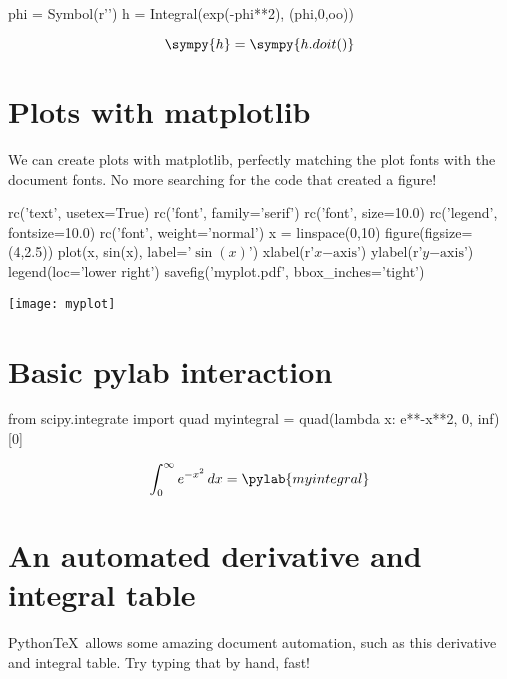 \documentclass[11pt]{article}
\newcommand{\pytex}{Python\TeX}
\begin{document}
\begin{sympyblock}
phi = Symbol(r'\phi')
h = Integral(exp(-phi**2), (phi,0,oo))
\end{sympyblock}

\[\sympy{h}=\sympy{h.doit()}\]



\section{Plots with matplotlib}

We can create plots with matplotlib, perfectly matching the plot fonts with the document fonts.  No more searching for the code that created a figure!

\begin{pylabblock}
rc('text', usetex=True)
rc('font', family='serif')
rc('font', size=10.0)
rc('legend', fontsize=10.0)
rc('font', weight='normal')
x = linspace(0,10)
figure(figsize=(4,2.5))
plot(x, sin(x), label='$\sin(x)$')
xlabel(r'$x\mathrm{-axis}$')
ylabel(r'$y\mathrm{-axis}$')
legend(loc='lower right')
savefig('myplot.pdf', bbox_inches='tight')
\end{pylabblock}

\begin{center}
\texttt{[image: myplot]}
\end{center}


\section{Basic pylab interaction}

\begin{pylabblock}
from scipy.integrate import quad
myintegral = quad(lambda x: e**-x**2, 0, inf)[0]
\end{pylabblock}

\[ \int_0^\infty e^{-x^2}\,dx = \pylab{myintegral} \]


\section{An automated derivative and integral table}

\pytex\ allows some amazing document automation, such as this derivative and integral table.  Try typing that by hand, fast!
\end{document}
